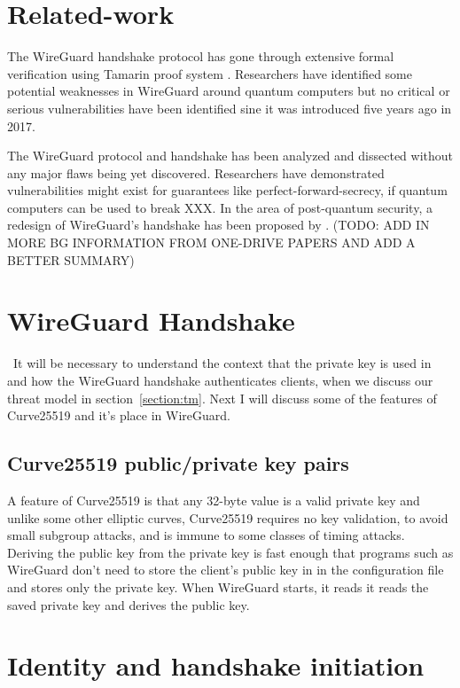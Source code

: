 \documentclass [11pt, proquest] {uwthesis}[2020/02/24]
\begin{document}
\section {Related-work}
The WireGuard handshake protocol has gone through extensive formal verification using Tamarin proof system \cite{donenfeld_formal_2018}. Researchers have identified some potential weaknesses in WireGuard around quantum computers but no critical or serious vulnerabilities have been identified sine it was introduced five years ago in 2017.

The WireGuard protocol and handshake has been analyzed and dissected without any major flaws being yet discovered. Researchers have demonstrated vulnerabilities might exist for guarantees like perfect-forward-secrecy, if quantum computers can be used to break XXX.  In the area of post-quantum security, a redesign of WireGuard's handshake has been proposed by \cite{hulsing_post-quantum_2021}.
(TODO: ADD IN MORE BG INFORMATION FROM ONE-DRIVE PAPERS AND ADD A BETTER SUMMARY)

\section {WireGuard Handshake}
\ It will be necessary to understand the context that the private key is used in and how the WireGuard handshake authenticates clients, when we discuss our threat model in section~\ref{section:tm}. Next I will discuss some of the features of Curve25519 and it's place in WireGuard.
\subsection{Curve25519 public/private key pairs}
A feature of Curve25519 is that any 32-byte value is a valid private key and unlike some other elliptic curves, Curve25519 requires no key validation, to avoid small subgroup attacks, and is immune to some classes of timing attacks\cite{noauthor_safecurves_2022}\cite{sasdrich_implementing_2015}.  Deriving the public key from the private key is fast enough that programs such as WireGuard don't need to store the client's public key in in the configuration file and stores only the private key. When WireGuard starts, it reads it reads the saved private key and derives the public key. 

\section {Identity and handshake initiation}
\label{handshake_message}
\end{document}
